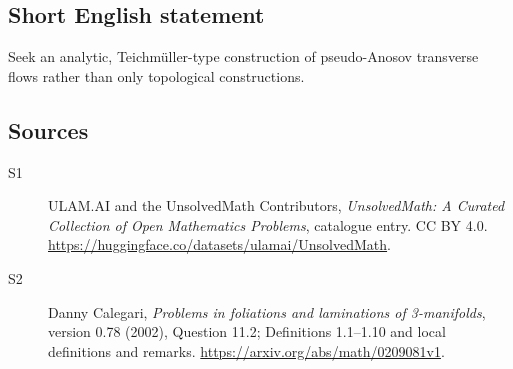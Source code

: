 \documentclass[11pt]{article}
\begin{document}
\subsection{Short English statement}
Seek an analytic, Teichmüller-type construction of pseudo-Anosov transverse flows rather than only topological constructions.
\subsection{Sources}
\begin{description}
\item[\hypertarget{source:statement:1}{S1}] ULAM.AI and the UnsolvedMath Contributors, \emph{UnsolvedMath: A Curated Collection of Open Mathematics Problems}, catalogue entry. CC BY 4.0. \url{https://huggingface.co/datasets/ulamai/UnsolvedMath}.
\item[\hypertarget{source:statement:2}{S2}] Danny Calegari, \emph{Problems in foliations and laminations of 3-manifolds}, version 0.78 (2002), Question 11.2; Definitions 1.1--1.10 and local definitions and remarks. \url{https://arxiv.org/abs/math/0209081v1}.
\end{description}
\label{end:statement}
\end{document}
